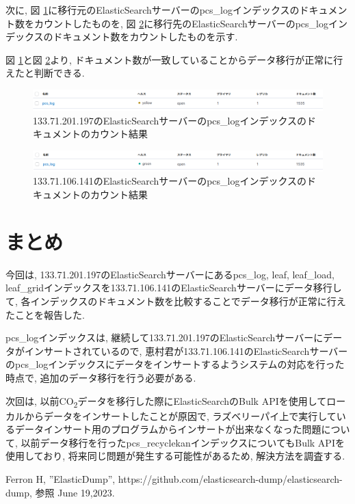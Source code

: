 \documentclass[a4j,12pt,]{jarticle}
\begin{document}
次に, 図 \ref{p4}に移行元のElasticSearchサーバーのpcs\_logインデックスのドキュメント数をカウントしたものを, 図 \ref{p5}に移行先のElasticSearchサーバーのpcs\_logインデックスのドキュメント数をカウントしたものを示す.

図 \ref{p4}と図 \ref{p5}より, ドキュメント数が一致していることからデータ移行が正常に行えたと判断できる.

\begin{figure}[H]
  \begin{center}
    \includegraphics[width=160mm]{197pcs.png}
    \caption{133.71.201.197のElasticSearchサーバーのpcs\_logインデックスのドキュメントのカウント結果}
    \label{p4}
  \end{center}
\end{figure}

\begin{figure}[H]
  \begin{center}
    \includegraphics[width=160mm]{141pcs.png}
    \caption{133.71.106.141のElasticSearchサーバーのpcs\_logインデックスのドキュメントのカウント結果}
    \label{p5}
  \end{center}
\end{figure}

\section{まとめ}
今回は, 133.71.201.197のElasticSearchサーバーにあるpcs\_log, leaf, leaf\_load, leaf\_gridインデックスを133.71.106.141のElasticSearchサーバーにデータ移行して, 各インデックスのドキュメント数を比較することでデータ移行が正常に行えたことを報告した.

pcs\_logインデックスは, 継続して133.71.201.197のElasticSearchサーバーにデータがインサートされているので, 恵村君が133.71.106.141のElasticSearchサーバーのpcs\_logインデックスにデータをインサートするようシステムの対応を行った時点で, 追加のデータ移行を行う必要がある.

次回は, 以前CO\textsubscript{2}データを移行した際にElasticSearchのBulk APIを使用してローカルからデータをインサートしたことが原因で, ラズベリーパイ上で実行しているデータインサート用のプログラムからインサートが出来なくなった問題について, 以前データ移行を行ったpcs\_recyclekanインデックスについてもBulk APIを使用しており, 将来同じ問題が発生する可能性があるため, 解決方法を調査する.

\begin{thebibliography}{5}
  Ferron H, ”ElasticDump”, https://github.com/elasticsearch-dump/elasticsearch-dump, 参照 June 19,2023.
\end{thebibliography}
\end{document}
